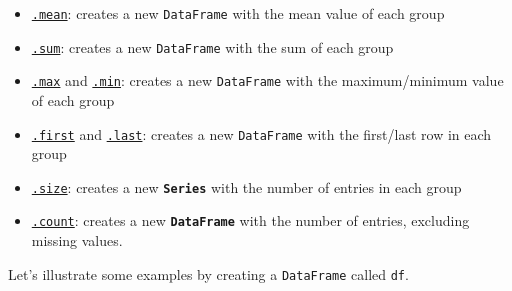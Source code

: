 \documentclass[
  letterpaper,
  DIV=11,
  numbers=noendperiod]{scrreprt}
\providecommand{\tightlist}{%
  \setlength{\itemsep}{0pt}\setlength{\parskip}{0pt}}\usepackage{longtable,booktabs,array}
\begin{document}
\begin{itemize}
\tightlist
\item
  \href{https://pandas.pydata.org/docs/reference/api/pandas.core.groupby.DataFrameGroupBy.mean.html\#pandas.core.groupby.DataFrameGroupBy.mean}{\texttt{.mean}}:
  creates a new \texttt{DataFrame} with the mean value of each group
\item
  \href{https://pandas.pydata.org/docs/reference/api/pandas.core.groupby.DataFrameGroupBy.sum.html\#pandas.core.groupby.DataFrameGroupBy.sum}{\texttt{.sum}}:
  creates a new \texttt{DataFrame} with the sum of each group
\item
  \href{https://pandas.pydata.org/docs/reference/api/pandas.core.groupby.DataFrameGroupBy.max.html\#pandas.core.groupby.DataFrameGroupBy.max}{\texttt{.max}}
  and
  \href{https://pandas.pydata.org/docs/reference/api/pandas.core.groupby.DataFrameGroupBy.min.html\#pandas.core.groupby.DataFrameGroupBy.min}{\texttt{.min}}:
  creates a new \texttt{DataFrame} with the maximum/minimum value of
  each group
\item
  \href{https://pandas.pydata.org/docs/reference/api/pandas.core.groupby.DataFrameGroupBy.first.html\#pandas.core.groupby.DataFrameGroupBy.first}{\texttt{.first}}
  and
  \href{https://pandas.pydata.org/docs/reference/api/pandas.core.groupby.DataFrameGroupBy.last.html\#pandas.core.groupby.DataFrameGroupBy.last}{\texttt{.last}}:
  creates a new \texttt{DataFrame} with the first/last row in each group
\item
  \href{https://pandas.pydata.org/docs/reference/api/pandas.core.groupby.DataFrameGroupBy.size.html\#pandas.core.groupby.DataFrameGroupBy.size}{\texttt{.size}}:
  creates a new \textbf{\texttt{Series}} with the number of entries in
  each group
\item
  \href{https://pandas.pydata.org/docs/reference/api/pandas.core.groupby.DataFrameGroupBy.count.html\#pandas.core.groupby.DataFrameGroupBy.count}{\texttt{.count}}:
  creates a new \textbf{\texttt{DataFrame}} with the number of entries,
  excluding missing values.
\end{itemize}

Let's illustrate some examples by creating a \texttt{DataFrame} called
\texttt{df}.
\end{document}
